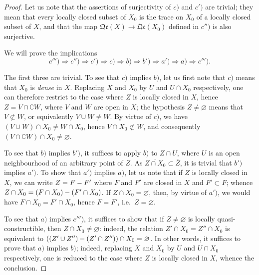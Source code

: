 \begin{proof}
Let us note that the assertions of surjectivity of $c)$ and $c')$ are trivial; they mean that every locally closed subset of $X_0$ is the trace on $X_0$ of a locally closed subset of $X$, and that the map $\mathfrak{Qc}(X)\to\mathfrak{Qc}(X_0)$ defined in $c'')$ is also surjective.

We will prove the implications
\[
  c''')\Rightarrow c'')\Rightarrow c')\Rightarrow c)\Rightarrow b)\Rightarrow b')\Rightarrow a')\Rightarrow a)\Rightarrow c''').
\]

The first three are trivial.
To see that $c)$ implies $b)$, let us first note that $c)$ means that $X_0$ is \emph{dense} in $X$.
Replacing $X$ and $X_0$ by $U$ and $U\cap X_0$ respectively, one can therefore restrict to the case where $Z$ is locally closed in $X$, hence $Z=V\cap\complement W$, where $V$ and $W$ are open in $X$; the hypothesis $Z\neq\varnothing$ means that $V\not\subset W$, or equivalently $V\cup W\neq W$.
By virtue of $c)$, we have $(V\cup W)\cap X_0\neq W\cap X_0$, hence $V\cap X_0\not\subset W$, and consequently $(V\cap\complement W)\cap X_0\neq\varnothing$.

To see that $b)$ implies $b')$, it suffices to apply $b)$ to $Z\cap U$, where $U$ is an open neighbourhood of an arbitrary point of $Z$.
As $\overline{Z\cap X_0}\subset\overline{Z}$, it is trivial that $b')$ implies $a')$.
To show that $a')$ implies $a)$, let us note that if $Z$ is locally closed in $X$, we can write $Z=F- F'$ where $F$ and $F'$ are closed in $X$ and $F'\subset F$; whence $Z\cap X_0=(F\cap X_0)-(F'\cap X_0)$.
If $Z\cap X_0=\varnothing$, then, by virtue of $a')$, we would have $F\cap X_0=F'\cap X_0$, hence $F=F'$, i.e.\ $Z=\varnothing$.

To see that $a)$ implies $c''')$, it suffices to show that if $Z\neq\varnothing$ is locally quasi-constructible, then $Z\cap X_0\neq\varnothing$: indeed, the relation $Z'\cap X_0=Z''\cap X_0$ is equivalent to $((Z'\cup Z'')-(Z'\cap Z''))\cap X_0=\varnothing$.
In other words, it suffices to prove that $a)$ implies $b)$; indeed, replacing $X$ and $X_0$ by $U$ and $U\cap X_0$ respectively, one is reduced to the case where $Z$ is locally closed in $X$, whence the conclusion.


\end{proof}
